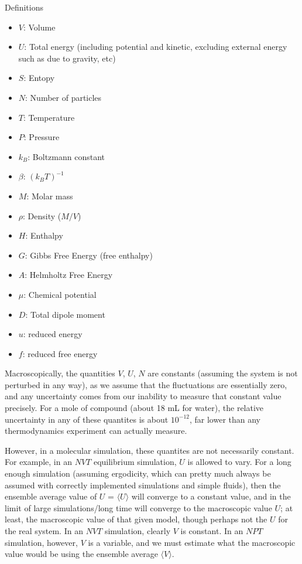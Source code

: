\documentclass[9pt,bestpractices]{livecoms}
\begin{document}
Definitions
\begin{itemize}
\item $V$: Volume
\item $U$: Total energy (including potential and kinetic, excluding external energy such as due to gravity, etc)
\item $S$: Entopy
\item $N$: Number of particles
\item $T$: Temperature
\item $P$: Pressure
\item $k_B$: Boltzmann constant
\item $\beta$: $(k_B T)^{-1}$
\item $M$: Molar mass
\item $\rho$: Density ($M/V$)
\item $H$: Enthalpy 
\item $G$: Gibbs Free Energy (free enthalpy)
\item $A$: Helmholtz Free Energy
\item $\mu$: Chemical potential
\item $D$: Total dipole moment
\item $u$: reduced energy
\item $f$: reduced free energy
\end{itemize}

Macroscopically, the quantities $V$, $U$, $N$ are constants (assuming
the system is not perturbed in any way), as we assume that the
fluctuations are essentially zero, and any uncertainty comes from our
inability to measure that constant value precisely. For a mole of
compound (about 18 mL for water), the relative uncertainty in any of
these quantites is about $10^{-12}$, far lower than any thermodynamics
experiment can actually measure.


However, in a molecular simulation, these quantites are not
necessarily constant. For example, in an $NVT$ equilibrium simulation,
$U$ is allowed to vary. For a long enough simulation (assuming
ergodicity, which can pretty much always be assumed with correctly
implemented simulations and simple fluids), then the ensemble average
value of $U$ = $\langle U \rangle$ will converge to a constant value,
and in the limit of large simulations/long time will converge to the
macroscopic value $U$; at least, the macroscopic value of that given
model, though perhaps not the $U$ for the real system. In an $NVT$
simulation, clearly $V$ is constant.  In an $NPT$ simulation, however,
$V$ is a variable, and we must estimate what the macroscopic value
would be using the ensemble average $\langle V \rangle$.
\end{document}
